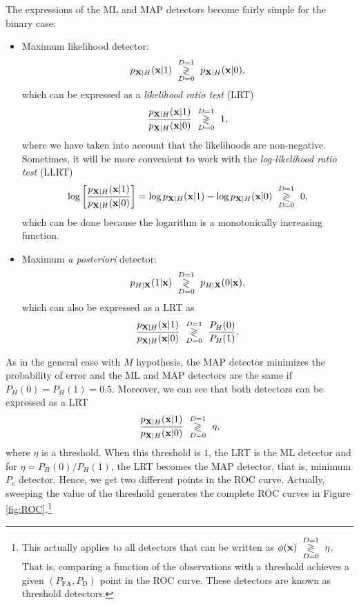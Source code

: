 The expressions of the ML and MAP detectors become fairly simple for the binary case:
\begin{itemize}
\item Maximum likelihood detector:
$$p_{{\bf X}|H}({\bf x}|1) \,\, \underset{D=0}{\overset{D=1}{\gtrless}}\,\, p_{{\bf X}|H}({\bf x}|0),$$
which can be expressed as a {\em likelihood ratio test} (LRT)
\begin{align*}
\label{eq:ML_LRT}
\frac{p_{{\bf X}|H}({\bf x}|1)}{p_{{\bf X}|H}({\bf x}|0)} \,\, \underset{D=0}{\overset{D=1}{\gtrless}}\,\, 1,
\end{align*}
where we have taken into account that the likelihoods are non-negative. Sometimes, it will be more convenient to work with the {\em log-likelihood ratio test} (LLRT)
\begin{equation}
\label{eq:LLRT}
\log \left[ \frac{p_{{\bf X}|H}({\bf x}|1)}{p_{{\bf X}|H}({\bf x}|0)} \right] 
	= \log p_{{\bf X}|H}({\bf x}|1) - \log p_{{\bf X}|H}({\bf x}|0) \,\, \underset{D=0}{\overset{D=1}{\gtrless}}\,\, 0,
\end{equation}
which can be done because the logarithm is a monotonically increasing function.
\item Maximum \emph{a posteriori} detector:
$$p_{H|{\bf X}}(1|{\bf x}) \,\, \underset{D=0}{\overset{D=1}{\gtrless}}\,\, p_{H|{\bf X}}(0|{\bf x}),$$
which can also be expressed as a LRT as
\begin{align} 
\frac{p_{{\bf X}|H}({\bf x}|1)}{p_{{\bf X}|H}({\bf x}|0)} 
	\,\, \underset{D=0}{\overset{D=1}{\gtrless}}\,\, \frac{P_H(0)}{P_H(1)}.
\end{align}
\end{itemize}

As in the general case with $M$ hypothesis, the MAP detector minimizes the probability of error and the ML and MAP detectors are the same if $P_H(0)=P_H(1)=0.5$. Moreover, we can see that both detectors can be expressed as a LRT
\begin{align} 
\label{eq:def_LRT}
\frac{p_{{\bf X}|H}({\bf x}|1)}{p_{{\bf X}|H}({\bf x}|0)} \,\, \underset{D=0}{\overset{D=1}{\gtrless}}\,\, \eta,
\end{align}
where $\eta$ is a threshold. When this threshold is $1$, the LRT is the ML detector and for $\eta = P_H(0)/P_H(1)$, the LRT becomes the MAP detector, that is, minimum $P_e$ detector. Hence, we get two different points in the ROC curve. Actually, sweeping the value of the threshold generates the complete ROC curves in Figure \ref{fig:ROC}.\footnote{This actually applies to all detectors that can be written as $\phi({\bf x}) \,\, \underset{D=0}{\overset{D=1}{\gtrless}}\,\, \eta$. That is, comparing a function of the observations with a threshold achieves a given $(P_\text{FA},P_\text{D})$ point in the ROC curve. These detectors are known as threshold detectors.}




